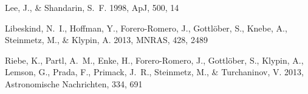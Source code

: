 \documentclass{iau}
\newcommand{\apj}{ApJ}
\newcommand{\mnras}{MNRAS}
\begin{document}
\begin{thebibliography}{}
{Lee}, J., \& {Shandarin}, S.~F. 1998, \apj, 500, 14

{Libeskind}, N.~I., {Hoffman}, Y., {Forero-Romero}, J., {Gottl{\"o}ber}, S.,
  {Knebe}, A., {Steinmetz}, M., \& {Klypin}, A. 2013, \mnras, 428, 2489

{Riebe}, K., {Partl}, A.~M., {Enke}, H., {Forero-Romero}, J., {Gottl{\"o}ber},
  S., {Klypin}, A., {Lemson}, G., {Prada}, F., {Primack}, J.~R., {Steinmetz},
  M., \& {Turchaninov}, V. 2013, Astronomische Nachrichten, 334, 691



\end{thebibliography}
\end{document}
